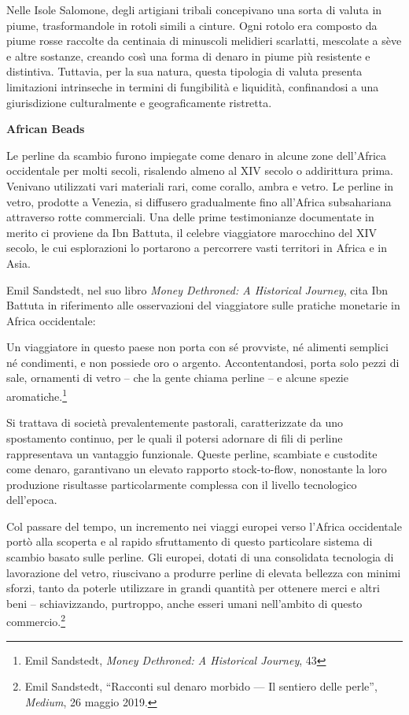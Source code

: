 \documentclass[
  a5paper,
  smalldemyvopaper,10pt,twoside,onecolumn,openright,extrafontsizes,hidelinks]{memoir}
\renewenvironment{quote}%
               {\list{}{\rightmargin=.6cm\leftmargin=.6cm}%
                \itshape \item[]}%
               {\endlist}
\begin{document}
Nelle Isole Salomone, degli artigiani tribali concepivano una sorta di
valuta in piume, trasformandole in rotoli simili a cinture. Ogni rotolo
era composto da piume rosse raccolte da centinaia di minuscoli melidieri
scarlatti, mescolate a sève e altre sostanze, creando così una forma di
denaro in piume più resistente e distintiva. Tuttavia, per la sua
natura, questa tipologia di valuta presenta limitazioni intrinseche in
termini di fungibilità e liquidità, confinandosi a una giurisdizione
culturalmente e geograficamente ristretta.

\textbf{African Beads}

Le perline da scambio furono impiegate come denaro in alcune zone
dell'Africa occidentale per molti secoli, risalendo almeno al XIV secolo
o addirittura prima. Venivano utilizzati vari materiali rari, come
corallo, ambra e vetro. Le perline in vetro, prodotte a Venezia, si
diffusero gradualmente fino all'Africa subsahariana attraverso rotte
commerciali. Una delle prime testimonianze documentate in merito ci
proviene da Ibn Battuta, il celebre viaggiatore marocchino del XIV
secolo, le cui esplorazioni lo portarono a percorrere vasti territori in
Africa e in Asia.

Emil Sandstedt, nel suo libro \emph{Money Dethroned: A Historical
Journey}, cita Ibn Battuta in riferimento alle osservazioni del
viaggiatore sulle pratiche monetarie in Africa occidentale:

\begin{quote}
Un viaggiatore in questo paese non porta con sé provviste, né alimenti
semplici né condimenti, e non possiede oro o argento. Accontentandosi,
porta solo pezzi di sale, ornamenti di vetro -- che la gente chiama
perline -- e alcune spezie aromatiche.\footnote{Emil Sandstedt,
  \emph{Money Dethroned: A Historical Journey}, 43}
\end{quote}

Si trattava di società prevalentemente pastorali, caratterizzate da uno
spostamento continuo, per le quali il potersi adornare di fili di
perline rappresentava un vantaggio funzionale. Queste perline, scambiate
e custodite come denaro, garantivano un elevato rapporto stock-to-flow,
nonostante la loro produzione risultasse particolarmente complessa con
il livello tecnologico dell'epoca.

Col passare del tempo, un incremento nei viaggi europei verso l'Africa
occidentale portò alla scoperta e al rapido sfruttamento di questo
particolare sistema di scambio basato sulle perline. Gli europei, dotati
di una consolidata tecnologia di lavorazione del vetro, riuscivano a
produrre perline di elevata bellezza con minimi sforzi, tanto da poterle
utilizzare in grandi quantità per ottenere merci e altri beni --
schiavizzando, purtroppo, anche esseri umani nell'ambito di questo
commercio.\footnote{Emil Sandstedt, ``Racconti sul denaro morbido --- Il
  sentiero delle perle'', \emph{Medium}, 26 maggio 2019.}
\end{document}
